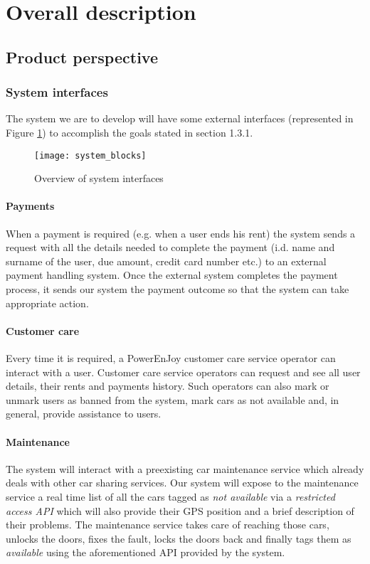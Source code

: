 \section{Overall description}
\subsection{Product perspective}
	\subsubsection{System interfaces}
	\label{sec:systemInterfaces}
		The system we are to develop will have some external interfaces (represented in Figure \ref{fig:systemInterfaces}) to accomplish the goals stated in section 1.3.1.
		\begin{figure}[h]
			\centering
			\texttt{[image: system\_blocks]}
			\caption{
				\label{fig:systemInterfaces} 
				Overview of system interfaces
			}
		\end{figure}
	\paragraph{Payments}
	When a payment is required (e.g. when a user ends his rent) the system sends a request with all the details needed to complete the payment (i.d. name and surname of the user, due amount, credit card number etc.) to an external payment handling system. Once the external system completes the payment process, it sends our system the payment outcome so that the system can take appropriate action.
	
	\paragraph{Customer care} Every time it is required, a PowerEnJoy customer care service operator can interact with a user. Customer care service operators can request and see all user details, their rents and payments history. Such operators can also mark or unmark users as banned from the system, mark cars as not available and, in general, provide assistance to users.

	\paragraph{Maintenance} The system will interact with a preexisting car maintenance service which already deals with other car sharing services. Our system will expose to the maintenance service a real time list of all the cars tagged as \emph{not available} via a \emph{restricted access API} which will also provide their GPS position and a brief description of their problems. The maintenance service takes care of reaching those cars, unlocks the doors,  fixes the fault, locks the doors back and finally tags them as \emph{available} using the aforementioned  API provided by the system.
	
